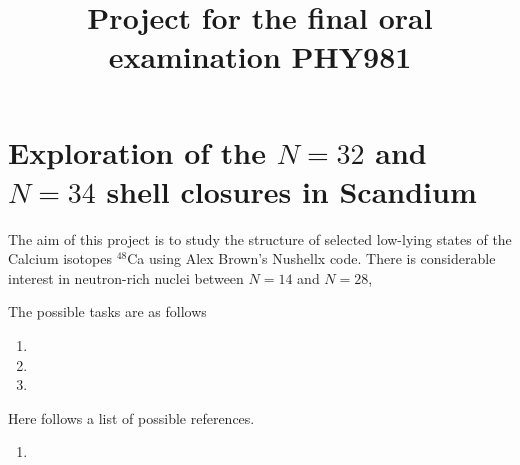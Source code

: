 \documentclass[prc]{revtex4}
\begin{document}
\title{Project for the final oral examination PHY981}
\maketitle
\section*{Exploration of the $N=32$ and $N=34$ shell closures in Scandium}

The aim of this project is to study the structure of selected low-lying states of the 
Calcium isotopes $^{48}$Ca using Alex Brown's Nushellx code. 
There is considerable interest in neutron-rich nuclei between $N = 14$ and $N = 28$,

The possible tasks are as follows
\begin{enumerate}
\item 
\item 
\item 
\end{enumerate}



Here follows a list of possible references.

\begin{enumerate}
\item
\end{enumerate}
\end{document}

